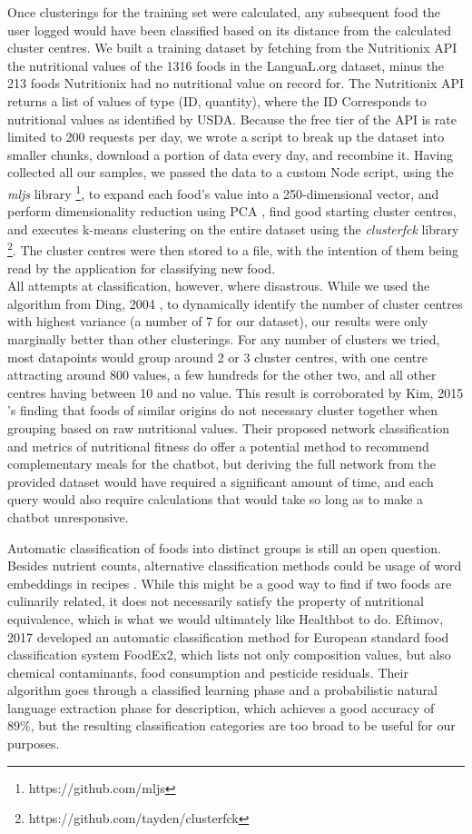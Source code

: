 Once clusterings for the training set were calculated, any subsequent food the user logged would have been classified based on its distance from the calculated cluster centres.
We built a training dataset by fetching from the Nutritionix API the nutritional values of the 1316 foods in the LanguaL.org dataset, minus the 213 foods Nutritionix had no nutritional value on record for. The Nutritionix API returns a list of values of type (ID, quantity), where the ID Corresponds to nutritional values as identified by USDA. Because the free tier of the API is rate limited to 200 requests per day, we wrote a script to break up the dataset into smaller chunks, download a portion of data every day, and recombine it. Having collected all our samples, we passed the data to a custom Node script, using the \textit{mljs} library \footnote{https://github.com/mljs}, to expand each food's value into a 250-dimensional vector, and perform dimensionality reduction using PCA \cite{Ding2004}, find good starting cluster centres, and executes k-means clustering on the entire dataset using the \textit{clusterfck} library \footnote{https://github.com/tayden/clusterfck}. The cluster centres were then stored to a file, with the intention of them being read by the application for classifying new food. \\
All attempts at classification, however, where disastrous. While we used the algorithm from Ding, 2004 \cite{Ding2004}, to dynamically identify the number of cluster centres with highest variance (a number of 7 for our dataset), our results were only marginally better than other clusterings. For any number of clusters we tried, most datapoints would group around 2 or 3 cluster centres, with one centre attracting around 800 values, a few hundreds for the other two, and all other centres having between 10 and no value. This result is corroborated by Kim, 2015 \cite{Kim2015a}'s finding that foods of similar origins do not necessary cluster together when grouping based on raw nutritional values. Their proposed network classification and metrics of nutritional fitness do offer a potential method to recommend complementary meals for the chatbot, but deriving the full network from the provided dataset would have required a significant amount of time, and each query would also require calculations that would take so long as to make a chatbot unresponsive.

Automatic classification of foods into distinct groups is still an open question. Besides nutrient counts, alternative classification methods could be usage of word embeddings in recipes \cite{food2vec}. While this might be a good way to find if two foods are culinarily related, it does not necessarily satisfy the property of nutritional equivalence, which is what we would ultimately like Healthbot to do.
Eftimov, 2017 \cite{Eftimov2017} developed an automatic classification method for European standard food classification system FoodEx2, which lists not only composition values, but also chemical contaminants, food consumption and pesticide residuals. Their algorithm goes through a classified learning phase and a probabilistic natural language extraction phase for description, which achieves a good accuracy of 89\%, but the resulting classification categories are too broad to be useful for our purposes.


